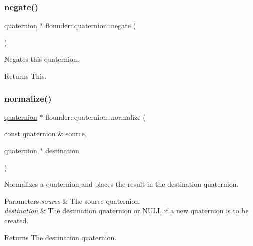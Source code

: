 \subsubsection{\texorpdfstring{negate()}{negate()}\hspace{0.1cm}{\footnotesize\ttfamily [2/2]}}
{\footnotesize\ttfamily \hyperlink{classflounder_1_1quaternion}{quaternion} $\ast$ flounder\+::quaternion\+::negate (\begin{DoxyParamCaption}{ }\end{DoxyParamCaption})}



Negates this quaternion. 

\begin{DoxyReturn}{Returns}
This. 
\end{DoxyReturn}
\mbox{\label{classflounder_1_1quaternion_ae5092edec94adfdd43add8f3825072fe}} 
\subsubsection{\texorpdfstring{normalize()}{normalize()}\hspace{0.1cm}{\footnotesize\ttfamily [1/2]}}
{\footnotesize\ttfamily \hyperlink{classflounder_1_1quaternion}{quaternion} $\ast$ flounder\+::quaternion\+::normalize (\begin{DoxyParamCaption}\item[{const \hyperlink{classflounder_1_1quaternion}{quaternion} \&}]{source,  }\item[{\hyperlink{classflounder_1_1quaternion}{quaternion} $\ast$}]{destination }\end{DoxyParamCaption})\hspace{0.3cm}{\ttfamily [static]}}



Normalizes a quaternion and places the result in the destination quaternion. 


\begin{DoxyParams}{Parameters}
{\em source} & The source quaternion. \\
\hline
{\em destination} & The destination quaternion or N\+U\+LL if a new quaternion is to be created.\\
\hline
\end{DoxyParams}
\begin{DoxyReturn}{Returns}
The destination quaternion. 
\end{DoxyReturn}
\mbox{\label{classflounder_1_1quaternion_a01318feb0c32b259ee5325db9f78fe7e}} 
